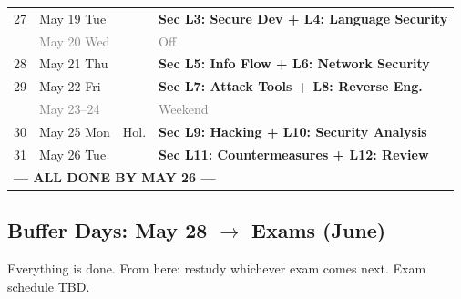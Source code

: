 \documentclass[11pt,a4paper]{article}
\begin{document}
\begin{center}
\begin{tabular}{clll}
27 & May 19 Tue & & \textbf{Sec L3: Secure Dev + L4: Language Security} \\
  & \textcolor{gray}{May 20 Wed} & & \textcolor{gray}{Off} \\
28 & May 21 Thu & & \textbf{Sec L5: Info Flow + L6: Network Security} \\
29 & May 22 Fri & & \textbf{Sec L7: Attack Tools + L8: Reverse Eng.} \\
  & \textcolor{gray}{May 23--24} & & \textcolor{gray}{Weekend} \\
30 & May 25 Mon & \textcolor{successgreen}{Hol.} & \textbf{Sec L9: Hacking + L10: Security Analysis} \\
31 & May 26 Tue & & \textbf{Sec L11: Countermeasures + L12: Review} \\
\midrule
\multicolumn{4}{l}{\textbf{--- ALL DONE BY MAY 26 ---}} \\
\bottomrule
\end{tabular}
\end{center}
\normalsize

\subsection{Buffer Days: May 28 $\rightarrow$ Exams (June)}

Everything is done. From here: restudy whichever exam comes next. Exam schedule TBD.
\end{document}
